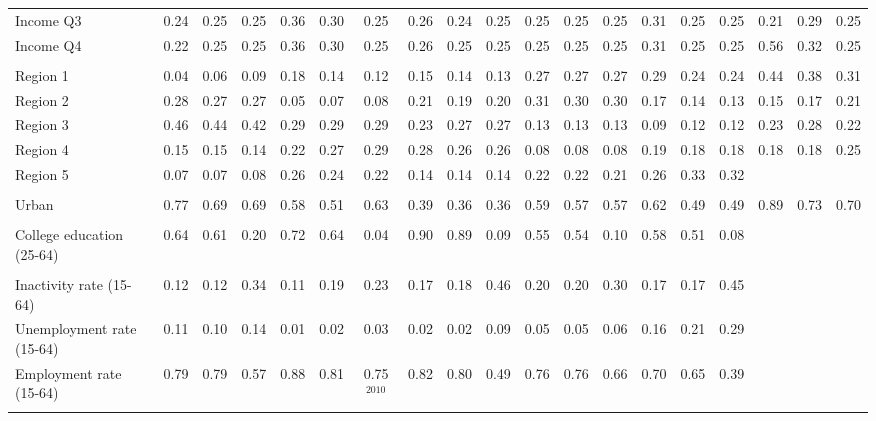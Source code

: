 \begin{tabular}{l*{18}{c}}
Income Q3 & 0.24 & 0.25 & 0.25 & 0.36 & 0.30 & 0.25 & 0.26 & 0.24 & 0.25 & 0.25 & 0.25 & 0.25 & 0.31 & 0.25 & 0.25 & 0.21 & 0.29 & 0.25 \\
Income Q4 & 0.22 & 0.25 & 0.25 & 0.36 & 0.30 & 0.25 & 0.26 & 0.25 & 0.25 & 0.25 & 0.25 & 0.25 & 0.31 & 0.25 & 0.25 & 0.56 & 0.32 & 0.25 \\
\\
Region 1 & 0.04 & 0.06 & 0.09 & 0.18 & 0.14 & 0.12 & 0.15 & 0.14 & 0.13 & 0.27 & 0.27 & 0.27 & 0.29 & 0.24 & 0.24 & 0.44 & 0.38 & 0.31 \\
Region 2 & 0.28 & 0.27 & 0.27 & 0.05 & 0.07 & 0.08 & 0.21 & 0.19 & 0.20 & 0.31 & 0.30 & 0.30 & 0.17 & 0.14 & 0.13 & 0.15 & 0.17 & 0.21 \\
Region 3 & 0.46 & 0.44 & 0.42 & 0.29 & 0.29 & 0.29 & 0.23 & 0.27 & 0.27 & 0.13 & 0.13 & 0.13 & 0.09 & 0.12 & 0.12 & 0.23 & 0.28 & 0.22 \\
Region 4 & 0.15 & 0.15 & 0.14 & 0.22 & 0.27 & 0.29 & 0.28 & 0.26 & 0.26 & 0.08 & 0.08 & 0.08 & 0.19 & 0.18 & 0.18 & 0.18 & 0.18 & 0.25 \\
Region 5 & 0.07 & 0.07 & 0.08 & 0.26 & 0.24 & 0.22 & 0.14 & 0.14 & 0.14 & 0.22 & 0.22 & 0.21 & 0.26 & 0.33 & 0.32 & & & \\
\\
Urban & 0.77 & 0.69 & 0.69 & 0.58 & 0.51 & 0.63 & 0.39 & 0.36 & 0.36 & 0.59 & 0.57 & 0.57 & 0.62 & 0.49 & 0.49 & 0.89 & 0.73 & 0.70 \\
\\
College education (25-64) & 0.64 & 0.61 & 0.20 & 0.72 & 0.64 & 0.04 & 0.90 & 0.89 & 0.09 & 0.55 & 0.54 & 0.10 & 0.58 & 0.51 & 0.08 & & & \\
\\
Inactivity rate (15-64) & 0.12 & 0.12 & 0.34 & 0.11 & 0.19 & 0.23 & 0.17 & 0.18 & 0.46 & 0.20 & 0.20 & 0.30 & 0.17 & 0.17 & 0.45 & & & \\
Unemployment rate (15-64) & 0.11 & 0.10 & 0.14 & 0.01 & 0.02 & 0.03 & 0.02 & 0.02 & 0.09 & 0.05 & 0.05 & 0.06 & 0.16 & 0.21 & 0.29 & & & \\
Employment rate (15-64) & 0.79 & 0.79 & 0.57 & 0.88 & 0.81 & 0.75$^\text{2010}$ & 0.82 & 0.80 & 0.49 & 0.76 & 0.76 & 0.66 & 0.70 & 0.65 & 0.39 & & & \\
\\
\bottomrule
\end{tabular}